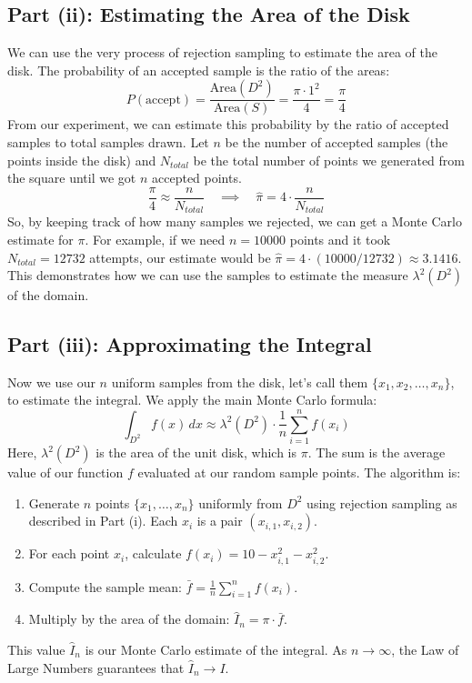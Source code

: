 \documentclass[11pt,a4paper]{article}
\begin{document}
\subsection{Part (ii): Estimating the Area of the Disk}

We can use the very process of rejection sampling to estimate the area of the disk. The probability of an accepted sample is the ratio of the areas:
\[ P(\text{accept}) = \frac{\text{Area}(D^2)}{\text{Area}(S)} = \frac{\pi \cdot 1^2}{4} = \frac{\pi}{4} \]
From our experiment, we can estimate this probability by the ratio of accepted samples to total samples drawn. Let $n$ be the number of accepted samples (the points inside the disk) and $N_{total}$ be the total number of points we generated from the square until we got $n$ accepted points.
\[ \frac{\pi}{4} \approx \frac{n}{N_{total}} \quad \implies \quad \hat{\pi} = 4 \cdot \frac{n}{N_{total}} \]
So, by keeping track of how many samples we rejected, we can get a Monte Carlo estimate for $\pi$. For example, if we need $n=10000$ points and it took $N_{total}=12732$ attempts, our estimate would be $\hat{\pi} = 4 \cdot (10000 / 12732) \approx 3.1416$. This demonstrates how we can use the samples to estimate the measure $\lambda^2(D^2)$ of the domain.

\subsection{Part (iii): Approximating the Integral}

Now we use our $n$ uniform samples from the disk, let's call them $\{x_1, x_2, \dots, x_n\}$, to estimate the integral. We apply the main Monte Carlo formula:
\[ \int_{D^2} f(x) \,dx \approx \lambda^2(D^2) \cdot \frac{1}{n} \sum_{i=1}^n f(x_i) \]
Here, $\lambda^2(D^2)$ is the area of the unit disk, which is $\pi$. The sum is the average value of our function $f$ evaluated at our random sample points.
The algorithm is:
\begin{enumerate}
    \item Generate $n$ points $\{x_1, \dots, x_n\}$ uniformly from $D^2$ using rejection sampling as described in Part (i). Each $x_i$ is a pair $(x_{i,1}, x_{i,2})$.
    \item For each point $x_i$, calculate $f(x_i) = 10 - x_{i,1}^2 - x_{i,2}^2$.
    \item Compute the sample mean: $\bar{f} = \frac{1}{n} \sum_{i=1}^n f(x_i)$.
    \item Multiply by the area of the domain: $\hat{I}_n = \pi \cdot \bar{f}$.
\end{enumerate}
This value $\hat{I}_n$ is our Monte Carlo estimate of the integral. As $n \to \infty$, the Law of Large Numbers guarantees that $\hat{I}_n \to I$.
\end{document}
